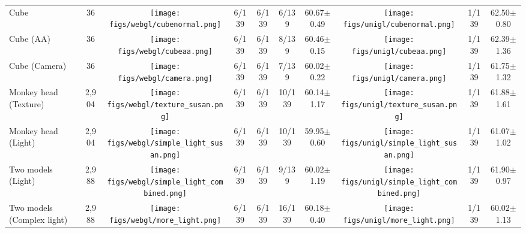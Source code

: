 \begin{table*}[t]
\begin{tabular}{lccccccccc}
\footnotesize Cube & \footnotesize 36 & \texttt{[image: figs/webgl/cubenormal.png]} & \footnotesize 6/139& \footnotesize 6/139& \footnotesize 6/139 & \footnotesize 60.67$\pm$0.49  & \texttt{[image: figs/unigl/cubenormal.png]} & \footnotesize 1/139 & \footnotesize 62.50$\pm$0.80 \\
\footnotesize Cube (AA) & \footnotesize 36 & \texttt{[image: figs/webgl/cubeaa.png]} & \footnotesize 6/139& \footnotesize 6/139& \footnotesize 8/139 & \footnotesize 60.46$\pm$0.15  & \texttt{[image: figs/unigl/cubeaa.png]} & \footnotesize 1/139 & \footnotesize 62.39$\pm$1.36 \\
\footnotesize Cube (Camera) & \footnotesize 36 & \texttt{[image: figs/webgl/camera.png]} & \footnotesize 6/139& \footnotesize 6/139& \footnotesize 7/139 &\footnotesize  60.02$\pm$0.22  & \texttt{[image: figs/unigl/camera.png]} &\footnotesize  1/139 & \footnotesize 61.75$\pm$1.32 \\
\footnotesize Monkey head (Texture) & \footnotesize 2,904 & \texttt{[image: figs/webgl/texture\_susan.png]} & \footnotesize 6/139& \footnotesize 6/139&\footnotesize  10/139 & \footnotesize 60.14$\pm$1.17  & \texttt{[image: figs/unigl/texture\_susan.png]} & \footnotesize 1/139 & \footnotesize 61.88$\pm$1.61 \\
\footnotesize Monkey head (Light) & \footnotesize 2,904 & \texttt{[image: figs/webgl/simple\_light\_susan.png]} & \footnotesize 6/139& \footnotesize 6/139& \footnotesize 10/139 & \footnotesize 59.95$\pm$0.60  & \texttt{[image: figs/unigl/simple\_light\_susan.png]} & \footnotesize 1/139 & \footnotesize 61.07$\pm$1.02 \\
\footnotesize Two models (Light) & \footnotesize 2,988 & \texttt{[image: figs/webgl/simple\_light\_combined.png]} & \footnotesize 6/139& \footnotesize 6/139& \footnotesize 9/139 & \footnotesize 60.02$\pm$1.19  & \texttt{[image: figs/unigl/simple\_light\_combined.png]} & \footnotesize 1/139 & \footnotesize 61.90$\pm$0.97 \\
\footnotesize Two models (Complex light) & \footnotesize 2,988 & \texttt{[image: figs/webgl/more\_light.png]}& \footnotesize 6/139& \footnotesize 6/139& \footnotesize 16/139 & \footnotesize 60.18$\pm$0.40  & \texttt{[image: figs/unigl/more\_light.png]} & \footnotesize 1/139 & \footnotesize 60.02$\pm$1.13 \\

\end{tabular}
\end{table*}
